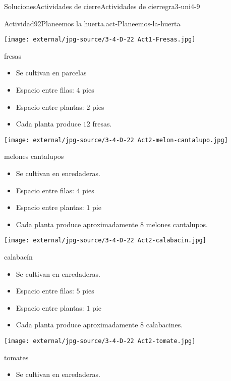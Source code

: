 \documentclass[twoside,10pt,]{article}
\begin{document}
\begin{solutions-section}{Soluciones}{Actividades de cierre}{}{Actividades de cierre}{}{}{gra3-uni4-9}
\begin{activitysolution}{Actividad}{92}{Planeemos la huerta.}{act-Planeemos-la-huerta}
\begin{sidebyside}{2}{0}{0}{0}
\begin{sbspanel}{0.5}
\texttt{[image: external/jpg-source/3-4-D-22 Act1-Fresas.jpg]}
%
\par
fresas%
%
\begin{itemize}[label=\textbullet]
\item{}Se cultivan en parcelas%
\item{}Espacio entre filas: \(4\) pies%
\item{}Espacio entre plantas: \(2\) pies%
\item{}Cada planta produce \(12\) fresas.%
\end{itemize}
\end{sbspanel}%
\begin{sbspanel}{0.5}%
\texttt{[image: external/jpg-source/3-4-D-22 Act2-melon-cantalupo.jpg]}
%
\par
melones cantalupos%
%
\begin{itemize}[label=\textbullet]
\item{}Se cultivan en enredaderas.%
\item{}Espacio entre filas: \(4\) pies%
\item{}Espacio entre plantas: \(1\) pie%
\item{}Cada planta produce aproximadamente \(8\) melones cantalupos.%
\end{itemize}
\end{sbspanel}%
\end{sidebyside}%
\begin{sidebyside}{2}{0}{0}{0}%
\begin{sbspanel}{0.5}%
\texttt{[image: external/jpg-source/3-4-D-22 Act2-calabacin.jpg]}
%
\par
calabacín%
%
\begin{itemize}[label=\textbullet]
\item{}Se cultivan en enredaderas.%
\item{}Espacio entre filas: \(5\) pies%
\item{}Espacio entre plantas: \(1\) pie%
\item{}Cada planta produce aproximadamente \(8\) calabacines.%
\end{itemize}
\end{sbspanel}%
\begin{sbspanel}{0.5}%
\texttt{[image: external/jpg-source/3-4-D-22 Act2-tomate.jpg]}
%
\par
tomates%
%
\begin{itemize}[label=\textbullet]
\item{}Se cultivan en enredaderas.%

\end{itemize}
\end{sbspanel}
\end{sidebyside}
\end{activitysolution}
\end{solutions-section}
\end{document}
